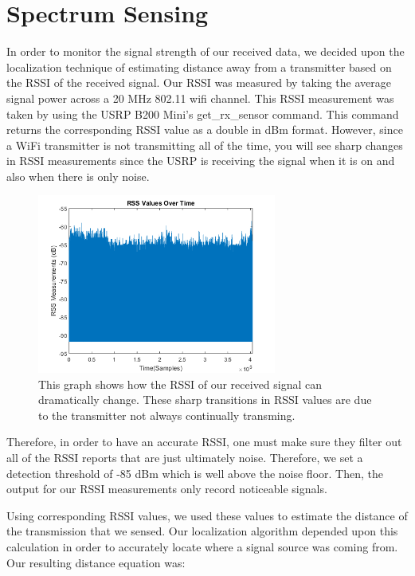 \section{Spectrum Sensing}

In order to monitor the signal strength of our received data, we decided upon the localization technique of estimating distance away from a transmitter based on the RSSI of the received signal.  Our RSSI was measured by taking the average signal power across a 20 MHz 802.11 wifi channel. This RSSI measurement was taken by using the USRP B200 Mini’s get\_rx\_sensor command.  This command returns the corresponding RSSI value as a double in dBm format.  However, since a WiFi transmitter is not transmitting all of the time, you will see sharp changes in RSSI measurements since the USRP is receiving the signal when it is on and also when there is only noise.

\begin{figure}[h]
	\centering
	\includegraphics[width=0.70\textwidth]{img/rss_vals_test.png}
	\caption{This graph shows how the RSSI of our received signal can dramatically change.  These sharp transitions in RSSI values are due to the transmitter not always continually transming.}
	\label{fig:rss_values}
\end{figure}
Therefore, in order to have an accurate RSSI, one must make sure they filter out all of the RSSI reports that are just ultimately noise.  Therefore, we set a detection threshold of -85 dBm which is well above the noise floor.  Then, the output for our RSSI measurements only record noticeable signals.  

Using corresponding RSSI values, we used these values to estimate the distance of the transmission that we sensed.  Our localization algorithm depended upon this calculation in order to accurately locate where a signal source was coming from.  Our resulting distance equation was:

